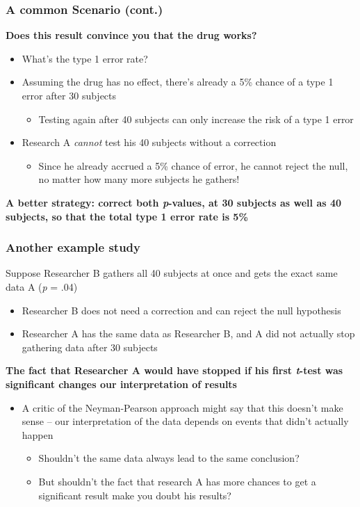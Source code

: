 \documentclass[10pt, block=fill]{beamer}
\begin{document}
\begin{frame}
  \frametitle{A common Scenario (cont.)}
  
  \textbf{Does this result convince you that the drug works?}
  \begin{itemize}
      \item What's the type 1 error rate?
      \item Assuming the drug has no effect, there's already a 5\% chance of a type 1 error after 30 subjects
      \begin{itemize}
          \item Testing again after 40 subjects can only increase the risk of a type 1 error
      \end{itemize}
      \item Research A \textit{cannot} test his 40 subjects without a correction
      \begin{itemize}
          \item Since he already accrued a 5\% chance of error, he cannot reject the null, no matter how many more subjects he gathers!
      \end{itemize}
  \end{itemize}
  
   \textbf{A better strategy: correct both \textit{p}-values, at 30 subjects as well as 40 subjects, so that the total type 1 error rate is 5\%}
\end{frame}


\begin{frame}
   \frametitle{Another example study}

   Suppose Researcher B gathers all 40 subjects at once and gets the exact same data A (\textit{p} = .04)   
   \begin{itemize}
       \item Researcher B does not need a correction and can reject the null hypothesis
       \item Researcher A has the same data as Researcher B, and A did not actually stop gathering data after 30 subjects
   \end{itemize}
   
   \textbf{The fact that Researcher A would have stopped if his first \textit{t}-test was significant changes our interpretation of results}
   \begin{itemize}
       \item A critic of the Neyman-Pearson approach might say that this doesn't make sense -- our interpretation of the data depends on events that didn't actually happen
       \begin{itemize}
           \item Shouldn't the same data always lead to the same conclusion?
           \item But shouldn't the fact that research A has more chances to get a significant result make you doubt his results?
       \end{itemize}
   \end{itemize}
    
\end{frame}
\end{document}
